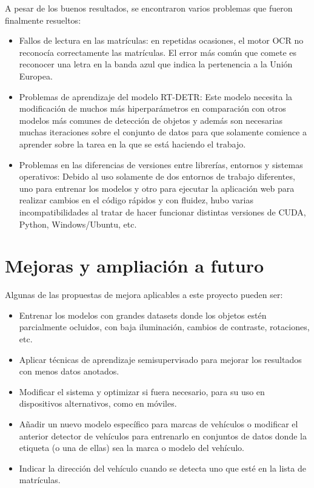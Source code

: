 \documentclass[12pt,a4paper,onecolumn,oneside]{report}
\begin{document}
A pesar de los buenos resultados, se encontraron varios problemas que fueron finalmente resueltos:
\begin{itemize}
    \item Fallos de lectura en las matrículas: en repetidas ocasiones, el motor OCR no reconocía correctamente las matrículas. El error más común que comete es reconocer una letra en la banda azul que indica la pertenencia a la Unión Europea.
    \item Problemas de aprendizaje del modelo RT-DETR: Este modelo necesita la modificación de muchos más hiperparámetros en comparación con otros modelos más comunes de detección de objetos y además son necesarias muchas iteraciones sobre el conjunto de datos para que solamente comience a aprender sobre la tarea en la que se está haciendo el trabajo.
    \item Problemas en las diferencias de versiones entre librerías, entornos y sistemas operativos: Debido al uso solamente de dos entornos de trabajo diferentes, uno para entrenar los modelos y otro para ejecutar la aplicación web para realizar cambios en el código rápidos y con fluidez, hubo varias incompatibilidades al tratar de hacer funcionar distintas versiones de CUDA, Python, Windows/Ubuntu, etc.
\end{itemize}

\section{Mejoras y ampliación a futuro}

Algunas de las propuestas de mejora aplicables a este proyecto pueden ser:

\begin{itemize}
    \item Entrenar los modelos con grandes datasets donde los objetos estén parcialmente ocluidos, con baja iluminación, cambios de contraste, rotaciones, etc.
    \item Aplicar técnicas de aprendizaje semisupervisado para mejorar los resultados con menos datos anotados.
    \item Modificar el sistema y optimizar si fuera necesario, para su uso en dispositivos alternativos, como en móviles.
    \item Añadir un nuevo modelo específico para marcas de vehículos o modificar el anterior detector de vehículos para entrenarlo en conjuntos de datos donde la etiqueta (o una de ellas) sea la marca o modelo del vehículo.
    \item Indicar la dirección del vehículo cuando se detecta uno que esté en la lista de matrículas.
\end{itemize}
\end{document}
